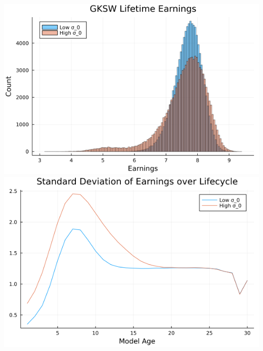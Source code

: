 \documentclass{article}
\begin{document}
\begin{enumerate}
\begin{center}
\includegraphics[scale = 0.5]{figure_4_histogram}
\includegraphics[scale = 0.5]{figure_4_sd}
\end{center}

\end{enumerate}
\end{document}
